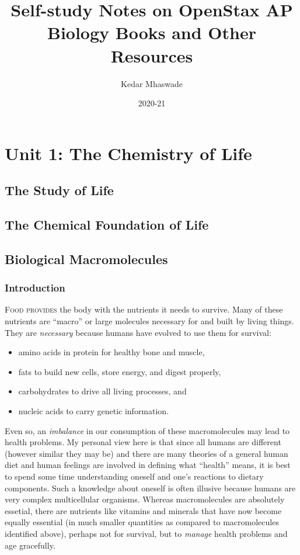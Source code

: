 \documentclass[12pt]{article}
\begin{document}
\title{Self-study Notes on OpenStax AP Biology Books and Other Resources}
\author{Kedar Mhaswade}
\date{2020-21}
\maketitle
\def\dev{\edef~{\string~}\textmarathi}
\section{Unit 1: The Chemistry of Life}
\subsection{The Study of Life}
\subsection{The Chemical Foundation of Life}
\subsection{Biological Macromolecules}
\subsubsection{Introduction}
\lettrine[lines=2]{F}{ood provides} the body with the nutrients it needs to survive. Many of these nutrients are ``macro'' or large molecules necessary for and built by living things. They are \emph{necessary} because humans have evolved to use them for survival: 
\begin{itemize}
    \item amino acids in protein for healthy bone and muscle, 
    \item fats to build new cells, store energy, and digest properly, 
    \item carbohydrates to drive all living processes, and
    \item nucleic acids to carry genetic information.
\end{itemize}

Even so, an \emph{imbalance} in our consumption of these macromolecules may lead to health problems. My personal view here is that since all humans are different (however similar they may be) and there are many theories of a general human diet and human feelings are involved in defining what ``health'' means, it is best to spend some time understanding oneself and one's reactions to dietary components. Such a knowledge about oneself is often illusive because humans are very complex multicellular organisms. Whereas macromolecules are absolutely essetial, there are nutrients like vitamins and minerals that have now become equally essential (in much smaller quantities as compared to macromolecules identified above), perhaps not for survival, but to  \emph{manage} health problems and age gracefully.
\end{document}
